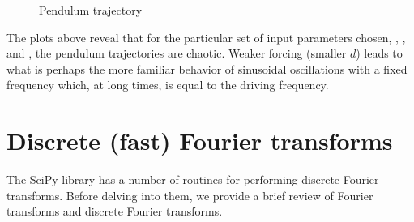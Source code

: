 \documentclass[letterpaper,10pt,english]{sphinxmanual}
\begin{document}
\begin{figure}[htbp]
\centering
\capstart

\caption{Pendulum trajectory}\label{chap9/chap9_scipy:fig-odepend}\end{figure}

The plots above reveal that for the particular set of input parameters chosen, , , and , the pendulum trajectories are chaotic.  Weaker forcing (smaller \(d\)) leads to what is perhaps the more familiar behavior of sinusoidal oscillations with a fixed frequency which, at long times, is equal to the driving frequency.


\section{Discrete (fast) Fourier transforms}
\label{chap9/chap9_scipy:index-5}\label{chap9/chap9_scipy:discrete-fast-fourier-transforms}
The SciPy library has a number of routines for performing discrete Fourier transforms.  Before delving into them, we provide a brief review of Fourier transforms and discrete Fourier transforms.
\end{document}

